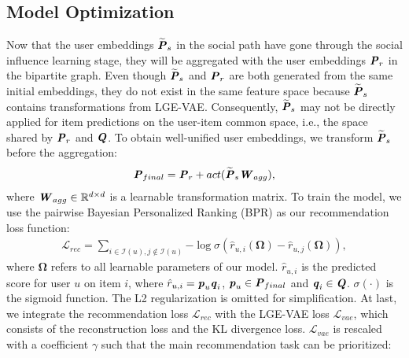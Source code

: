 \documentclass[letterpaper]{article} %
\begin{document}
\subsection{Model Optimization}
Now that the user embeddings $\widetilde{\textbf{\textit{P}}}_{s}$ in the social path have gone through the social influence learning stage, they will be aggregated with the user embeddings $\textbf{\textit{P}}_{r}$ in the bipartite graph. Even though $\widetilde{\textbf{\textit{P}}}_{s}$ and $\textbf{\textit{P}}_{r}$ are both generated from the same initial embeddings, they do not exist in the same feature space because $\widetilde{\textbf{\textit{P}}}_{s}$ contains transformations from LGE-VAE. Consequently, $\widetilde{\textbf{\textit{P}}}_{s}$ may not be directly applied for item predictions on the user-item common space, i.e., the space shared by $\textbf{\textit{P}}_{r}$ and $\textbf{\textit{Q}}$. To obtain well-unified user embeddings, we transform $\widetilde{\textbf{\textit{P}}}_{s}$ before the aggregation:
\begin{align}
    \textbf{\textit{P}}_{final} = \textbf{\textit{P}}_{r} + act(\widetilde{\textbf{\textit{P}}}_{s}\textbf{\textit{W}}_{agg}),
\end{align}
where $\textbf{\textit{W}}_{agg} \in \mathbb{R}^{d\times d}$ is a learnable transformation matrix. To train the model, we use the pairwise Bayesian Personalized Ranking (BPR) \cite{bpr} as our recommendation loss function: 
\begin{align}
    \mathcal{L}_{rec} = \sum_{i\in \mathcal{I}(u), j\notin \mathcal{I}(u)}{-\log \sigma(\hat{r}_{u,i}(\boldsymbol{\Omega})-\hat{r}_{u,j}(\boldsymbol{\Omega}))},
\end{align}
where $\boldsymbol{\Omega}$ refers to all learnable parameters of our model. $\hat{r}_{u,i}$ is the predicted score for user $u$ on item $i$, where $\hat{r}_{u,i}=\textbf{\textit{p}}_u \textbf{\textit{q}}_i$, $\textbf{\textit{p}}_u \in \textbf{\textit{P}}_{final}$ and $\textbf{\textit{q}}_i \in \textbf{\textit{Q}}$. $\sigma(\cdot)$ is the sigmoid function. The L2 regularization is omitted for simplification. At last, we integrate the recommendation loss $\mathcal{L}_{rec}$ with the LGE-VAE loss $\mathcal{L}_{vae}$, which consists of the reconstruction loss and the KL divergence loss. $\mathcal{L}_{vae}$ is rescaled with a coefficient $\gamma$ such that the main recommendation task can be prioritized:
\end{document}
